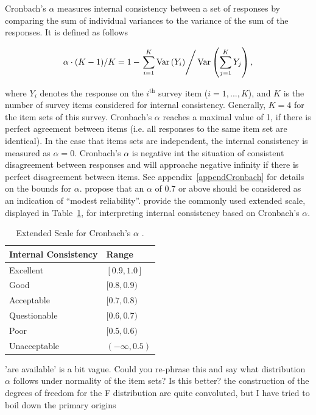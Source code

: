 \documentclass{article}\usepackage[]{graphicx}\usepackage[]{color}
\newcommand{\hh}[1]{{\color{ForestGreen} #1}}
\newcommand{\km}[1]{{\color{Orange} #1}}
\newcommand{\V}[1]{\text{Var}\left(#1\right)}
\begin{document}
Cronbach's $\alpha$ measures internal consistency between a set of responses by comparing the sum of individual variances to the variance of the sum of the responses. It is defined as follows

\begin{equation} \label{eq:alpha}
\alpha \cdot (K-1)/K =  1- \left . \sum_{i=1}^K \V{Y_i} \right /  \V{\sum_{j=1}^K Y_j},
\end{equation}

where $Y_i$ denotes the response on the $i^{\text{th}}$ survey item ($ i = 1,... , K$), and $K$ is the number of survey items considered for internal consistency. Generally, $K=4$ for the item sets of this survey.
Cronbach's $\alpha$ reaches a maximal value of 1, if there is perfect agreement between items (i.e. all responses to the same item set are identical). In the case that items sets are independent, the internal consistency is measured as $\alpha = 0 $. Cronbach's $\alpha$ is negative int the situation of consistent disagreement between responses and will approache negative infinity if there is perfect disagreement between items.  See appendix~\ref{appendCronbach} for details on the bounds for $\alpha$. 
 \citet[][p.~265]{Nunnally1978} propose that an $\alpha$ of 0.7 or above should be considered as an indication of ``modest reliability''.   \citet{GeorgeMallery2003} provide the commonly used extended scale, displayed in Table~\ref{GMAlphaScale}, for interpreting internal consistency based on Cronbach's $\alpha$. \\

\begin{table}[H]
\centering
\begin{tabular}{ll}
\hline 
Internal Consistency & Range \\
\hline
Excellent &  $[ 0.9 , 1.0 ]$ \\
Good & $[ 0.8 , 0.9 )$ \\
Acceptable & $[ 0.7 , 0.8 ) $\\
Questionable & $[ 0.6 , 0.7 )$ \\
Poor & $[ 0.5 , 0.6 )$ \\
Unacceptable & $( -\infty, 0.5 )$ \\
\hline
\end{tabular}
\caption{Extended Scale for Cronbach's $\alpha$ \citep{GeorgeMallery2003}.} 
\label{GMAlphaScale}
\end{table}

\hh{'are available' is a bit vague. Could you re-phrase this and say what distribution $\alpha$ follows under normality of the item sets? } \km{Is this better? the construction of the degrees of freedom for the F distribution are quite convoluted, but I have tried to boil down the primary origins}\\
\end{document}
